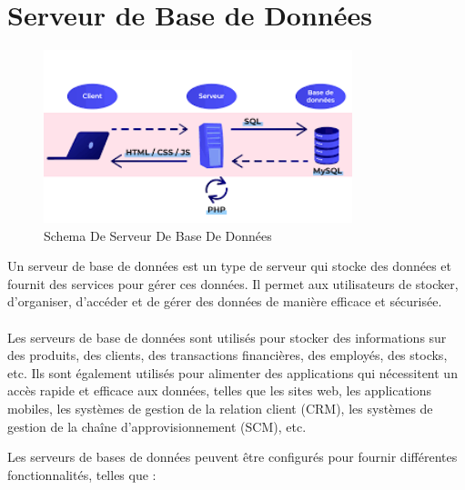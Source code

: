\section{Serveur de Base de Données } 
	\begin{figure}[h]
		\begin{center}
	\includegraphics[width=0.8\textwidth]{PhotoMemoire/serveur_bdd.png}
\caption{Schema De Serveur De Base De Données \cite{6}}
\end{center}
\end{figure}
Un serveur de base de données est un type de serveur qui stocke des données et fournit des services pour gérer ces données. Il permet aux utilisateurs de stocker, d'organiser, d'accéder et de gérer des données de manière efficace et sécurisée.
\paragraph{ }
Les serveurs de base de données sont utilisés pour stocker des informations sur des produits, des clients, des transactions financières, des employés, des stocks, etc. Ils sont également utilisés pour alimenter des applications qui nécessitent un accès rapide et efficace aux données, telles que les sites web, les applications mobiles, les systèmes de gestion de la relation client (CRM), les systèmes de gestion de la chaîne d'approvisionnement (SCM), etc.

Les serveurs de bases de données peuvent être configurés pour fournir différentes fonctionnalités, telles que :

